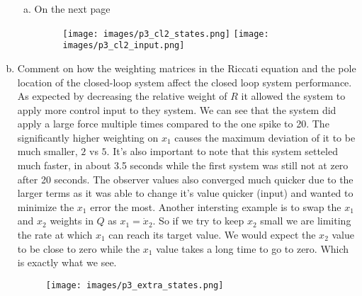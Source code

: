 \documentclass{article}
\begin{document}
\begin{enumerate}[(a)]
\begin{enumerate}[(a)]
\item On the next page
\begin{figure}[!htb]
\centering
\texttt{[image: images/p3\_cl2\_states.png]}
\texttt{[image: images/p3\_cl2\_input.png]}
\end{figure}

\end{enumerate}

\newpage
\item Comment on how the weighting matrices in the Riccati equation and the pole location of the closed-loop system affect the closed loop system performance.
\newline
As expected by decreasing the relative weight of $R$ it allowed the system to apply more control input to they system.
We can see that the system did apply a large force multiple times compared to the one spike to 20.
The significantly higher weighting on $x_1$ causes the maximum deviation of it to be much smaller, $2$ vs $5$.
It's also important to note that this system setteled much faster, in about 3.5 seconds while the first system was still not at zero after 20 seconds.
The observer values also converged much quicker due to the larger terms as it was able to change it's value quicker (input) and wanted to minimize the $x_1$ error the most.
\newline
\newline
Another intersting example is to swap the $x_1$ and $x_2$ weights in $Q$ as $x_1 = \dot{x}_2$.
So if we try to keep $x_2$ small we are limiting the rate at which $x_1$ can reach its target value.
We would expect the $x_2$ value to be close to zero while the $x_1$ value takes a long time to go to zero.
Which is exactly what we see.
\begin{figure}[!htb]
\centering
\texttt{[image: images/p3\_extra\_states.png]}
\end{figure}

\end{enumerate}
\end{document}
